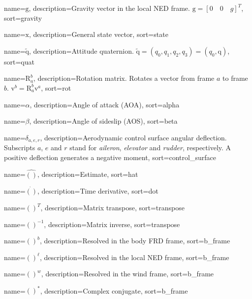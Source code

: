 {
	name={$\bm{\mathrm{g}}$},
	description={Gravity vector in the local NED frame. $\bm{\mathrm{g}} = [0 \quad 0 \quad g]^T$},
	sort=gravity
}

{
	name={$\bm{\mathrm{x}}$},
	description={General state vector},
	sort=state
}

{
	name={$\bm{\mathrm{\tilde{q}}}$},
	description={Attitude quaternion. $\bm{\mathrm{\tilde{q}}} = (q_0, q_1, q_2, q_3) = (q_0, \bm{\mathrm{q}})$},
	sort=quat
}

{
	name={$\bm{\mathrm{R}}_a^b$},
	description={Rotation matrix. Rotates a vector from frame $a$ to frame $b$. $\bm{\mathrm{v}}^b = \bm{\mathrm{R}}_a^b \bm{\mathrm{v}}^a$},
	sort=rot
}

{
	name={$\alpha$},
	description={Angle of attack (AOA)},
	sort=alpha
}

{
	name={$\beta$},
	description={Angle of sideslip (AOS)},
	sort=beta
}

{
	name={$\delta_{a,e,r}$},
	description={Aerodynamic control surface angular deflection. Subscripts $a$, $e$ and $r$ stand for \textit{aileron}, \textit{elevator} and \textit{rudder}, respectively. A positive deflection generates a negative moment},
	sort=control_surface
}

{
	name={$\hat{()}$},
	description={Estimate},
	sort=hat
}

{
	name={$\dot{()}$},
	description={Time derivative},
	sort=dot
}

{
	name={$()^T$},
	description={Matrix transpose},
	sort=transpose
}

{
	name={$()^{-1}$},
	description={Matrix inverse},
	sort=transpose
}

{
	name={$()^b$},
	description={Resolved in the body FRD frame},
	sort=b_frame
}

{
	name={$()^\ell$},
	description={Resolved in the local NED frame},
	sort=b_frame
}

{
	name={$()^w$},
	description={Resolved in the wind frame},
	sort=b_frame
}

{
	name={$()^*$},
	description={Complex conjugate},
	sort=b_frame
}

